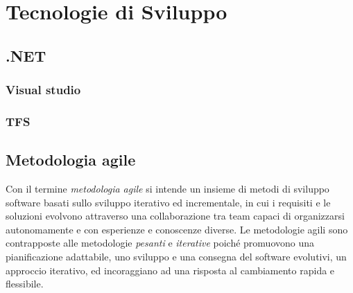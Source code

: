 \section{Tecnologie di Sviluppo}
\subsection{.NET}
\subsubsection{Visual studio}
\subsubsection{TFS}

\subsection{Metodologia agile}
Con il termine \textit{metodologia agile} si intende un insieme di metodi di sviluppo software basati sullo sviluppo iterativo ed incrementale, in cui i requisiti e le soluzioni evolvono attraverso una collaborazione tra team capaci di organizzarsi autonomamente e con esperienze e conoscenze diverse.
Le metodologie agili sono contrapposte alle metodologie \textit{pesanti} e \textit{iterative} poiché promuovono una pianificazione adattabile, uno sviluppo e una consegna del software evolutivi, un approccio iterativo, ed incoraggiano ad una risposta al cambiamento rapida e flessibile.

